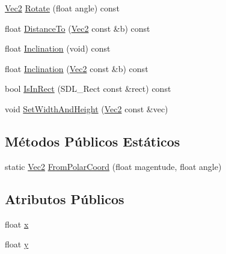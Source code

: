 \begin{DoxyCompactItemize}
\item 
\hyperlink{classVec2}{Vec2} \hyperlink{classVec2_abb4f9b393a08a4d19c5139a6ba5f5409}{Rotate} (float angle) const 
\item 
float \hyperlink{classVec2_aaf7c998a9f97f4a79e3900289ac566e0}{Distance\+To} (\hyperlink{classVec2}{Vec2} const \&b) const 
\item 
float \hyperlink{classVec2_a416d5d762750e1392139242fdcedb952}{Inclination} (void) const 
\item 
float \hyperlink{classVec2_afdc96d9f65aa822008b9cabc1f571747}{Inclination} (\hyperlink{classVec2}{Vec2} const \&b) const 
\item 
bool \hyperlink{classVec2_a788dc85f57e20be80e85543e6996a4f1}{Is\+In\+Rect} (S\+D\+L\+\_\+\+Rect const \&rect) const 
\item 
void \hyperlink{classVec2_a782588fd0ba59659df8b2a221b58896d}{Set\+Width\+And\+Height} (\hyperlink{classVec2}{Vec2} const \&vec)
\end{DoxyCompactItemize}
\subsection*{Métodos Públicos Estáticos}
\begin{DoxyCompactItemize}
\item 
static \hyperlink{classVec2}{Vec2} \hyperlink{classVec2_ac794548df48539be24dd1e8ebebf8038}{From\+Polar\+Coord} (float magentude, float angle)
\end{DoxyCompactItemize}
\subsection*{Atributos Públicos}
\begin{DoxyCompactItemize}
\item 
float \hyperlink{classVec2_adf8ee322d4b4bcc04146762c018d731f}{x}
\item 
float \hyperlink{classVec2_a30543787e62f6d915543cf1dfb04c094}{y}
\end{DoxyCompactItemize}


